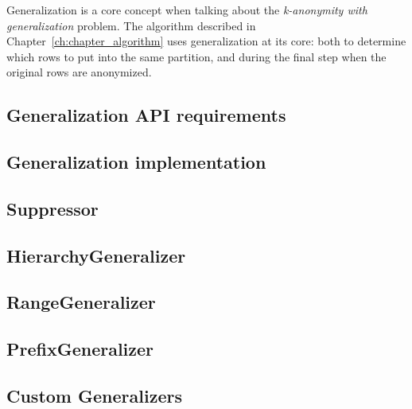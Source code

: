 Generalization is a core concept when talking about the \textit{k-anonymity with generalization} problem.
The algorithm described in Chapter~\ref{ch:chapter_algorithm} uses generalization at its core: both to determine which rows to put into the same partition, and during the final step when the original rows are anonymized.

\subsection{Generalization API requirements}\label{subsec:generalization_requirements}


\subsection{Generalization implementation}\label{subsec:generalization-implementation}


\subsection{Suppressor}


\subsection{HierarchyGeneralizer}\label{subsec:hierarchy_generalizer}


\subsection{RangeGeneralizer}


\subsection{PrefixGeneralizer}\label{subsec:prefix_generalizer}


\subsection{Custom Generalizers}
